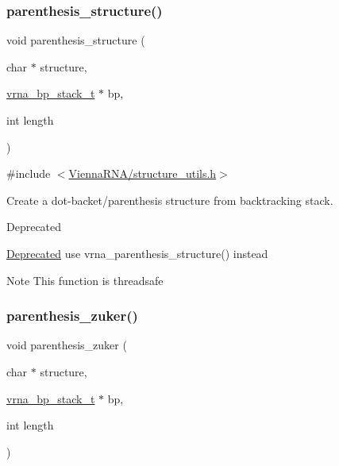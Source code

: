 \subsubsection{\texorpdfstring{parenthesis\+\_\+structure()}{parenthesis\_structure()}}
{\footnotesize\ttfamily void parenthesis\+\_\+structure (\begin{DoxyParamCaption}\item[{char $\ast$}]{structure,  }\item[{\hyperlink{group__data__structures_gaa651bda42e7692f08cb603cd6834b0ee}{vrna\+\_\+bp\+\_\+stack\+\_\+t} $\ast$}]{bp,  }\item[{int}]{length }\end{DoxyParamCaption})}



{\ttfamily \#include $<$\hyperlink{structure__utils_8h}{Vienna\+R\+N\+A/structure\+\_\+utils.\+h}$>$}



Create a dot-\/backet/parenthesis structure from backtracking stack. 

\begin{DoxyRefDesc}{Deprecated}
\item[\hyperlink{deprecated__deprecated000148}{Deprecated}]use vrna\+\_\+parenthesis\+\_\+structure() instead\end{DoxyRefDesc}


\begin{DoxyNote}{Note}
This function is threadsafe 
\end{DoxyNote}
\mbox{\label{group__struct__utils_gab9c5c8311bd5120900585d4fa50c2df0}} 
\subsubsection{\texorpdfstring{parenthesis\+\_\+zuker()}{parenthesis\_zuker()}}
{\footnotesize\ttfamily void parenthesis\+\_\+zuker (\begin{DoxyParamCaption}\item[{char $\ast$}]{structure,  }\item[{\hyperlink{group__data__structures_gaa651bda42e7692f08cb603cd6834b0ee}{vrna\+\_\+bp\+\_\+stack\+\_\+t} $\ast$}]{bp,  }\item[{int}]{length }\end{DoxyParamCaption})}



